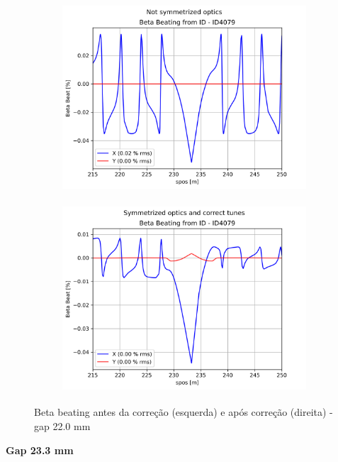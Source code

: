 \documentclass[a4paper,12pt]{article}
\begin{document}
\begin{figure}[H]
\begin{subfigure}{0.5\textwidth}
\includegraphics[width=0.9\linewidth, height=7cm]{figs/phase0 gap22 uncorrected-optics.png} 
\label{fig:subim1022}
\end{subfigure}
\begin{subfigure}{0.5\textwidth}
\includegraphics[width=0.9\linewidth, height=7cm]{figs/phase0 gap22 corrected-optics-tunes.png}
\label{fig:subim2022}
\end{subfigure}
\caption{Beta beating antes da correção (esquerda) e após correção (direita) - gap 22.0 mm}
\label{fig:bb0_22}
\end{figure}

\textbf{Gap 23.3 mm} \\
\end{document}

